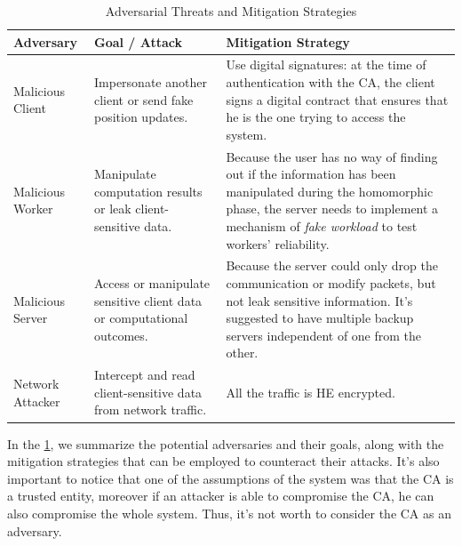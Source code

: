 \begin{table}[h]
\renewcommand{\arraystretch}{1.3}
\small
\begin{tabularx}{\linewidth}{|l|X|X|}
\hline
\textbf{Adversary} & \textbf{Goal / Attack} & \textbf{Mitigation Strategy} \\ \hline

Malicious Client &
Impersonate another client or send fake position updates. &
Use digital signatures: at the time of authentication with the CA, the client signs a digital contract that ensures that he is the one trying to access the system. \\ \hline

Malicious Worker &
Manipulate computation results or leak client-sensitive data. &
Because the user has no way of finding out if the information has been manipulated during the homomorphic phase, the server needs to implement a mechanism of \emph{fake workload} to test workers' reliability. \\ \hline

Malicious Server &
Access or manipulate sensitive client data or computational outcomes. &
Because the server could only drop the communication or modify packets, but not leak sensitive information. It's suggested to have multiple backup servers independent of one from the other. \\ \hline

Network Attacker &
Intercept and read client-sensitive data from network traffic. &
All the traffic is HE encrypted. \\ \hline

\end{tabularx}
\caption{Adversarial Threats and Mitigation Strategies}
\label{table:adversaries}
\end{table}

In the \cref{table:adversaries}, we summarize the potential adversaries and their goals, along with the mitigation strategies that can be employed to counteract their attacks. It's also important to notice that one of the assumptions of the system was that the CA is a trusted entity, moreover if an attacker is able to compromise the CA, he can also compromise the whole system. Thus, it's not worth to consider the CA as an adversary.
